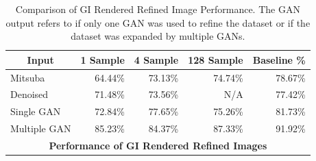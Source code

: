 \documentclass[10pt,twocolumn,letterpaper]{article}
\newcommand{\tompson}[1]{{\color{green} JT: #1}}
\begin{document}
\begin{table}[]
\centering
\begin{tabular}{|l|r|r|r|r|}
\hline
\multicolumn{1}{|c|}{\textbf{Input}}
& \multicolumn{1}{c|}{\textbf{1 Sample}}
& \multicolumn{1}{c|}{\textbf{4 Sample}}
& \multicolumn{1}{c|}{\textbf{128 Sample}}
& \multicolumn{1}{c|}{\textbf{Baseline \%}} \\ \hline
Mitsuba		& 64.44\%	& 73.13\%	& 74.74\%	& 78.67\% \\
Denoised	& 71.48\%	& 73.56\%	& N/A 		& 77.42\%	\\
Single GAN	& 72.84\%	& 77.65\% 	& 75.26\%	& 81.73\%	\\
Multiple GAN& 85.23\%	& 84.37\% 	& 87.33\% 	& 91.92\%		\\ \hline
\multicolumn{5}{|c|}{\textbf{Performance of GI Rendered Refined Images}}	\\ \hline
\end{tabular}
\caption{Comparison of GI Rendered Refined Image Performance. The GAN output refers to if only one GAN was used to refine the dataset or if the dataset was expanded by multiple GANs.}
\label{tblallrefined}
\end{table}
\end{document}
